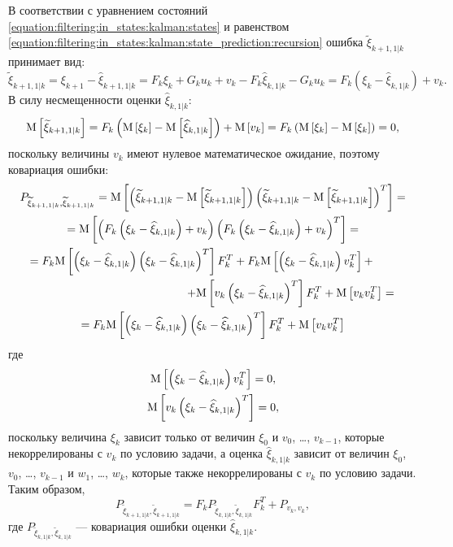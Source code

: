 В соответствии с уравнением состояний \eqref{equation:filtering:in_states:kalman:states} и равенством
\eqref{equation:filtering:in_states:kalman:state_prediction:recursion} ошибка $\widetilde{\xi}_{k+1, 1|k}$ принимает вид:
$$
	\widetilde{\xi}_{k+1,1|k}
		= \xi_{k+1} - \widehat{\xi}_{k+1,1|k}
		= F_k \xi_k + G_k u_k + v_k - F_k \widehat{\xi}_{k,1|k} - G_k u_k
		= F_k \left ( \xi_k - \widehat{\xi}_{k,1|k} \right ) + v_k
	.
$$
В силу несмещенности оценки $\widehat{\xi}_{k,1|k}$:
\begin{equation} \label{equation:filtering:in_states:kalman:state_prediction:unbiasedness}
	\mathrm{M} \left [ \widetilde{\xi}_{k+1,1|k} \right ]
		= F_k \left ( \mathrm{M} \left [ \xi_k \right ] - \mathrm{M} \left [ \widehat{\xi}_{k,1|k} \right ] \right ) + \mathrm{M} \left [ v_k \right ]
		= F_k \left ( \mathrm{M} \left [ \xi_k \right ] - \mathrm{M} \left [ \xi_k \right ] \right )
		= 0
	,
\end{equation}
поскольку величины $v_k$ имеют нулевое математическое ожидание, поэтому ковариация ошибки:
\begin{multline*}
	P_{\widetilde{\xi}_{k+1,1|k}, \widetilde{\xi}_{k+1,1|k}}
		= \outerexpectation{\widetilde{\xi}_{k+1,1|k}}{\widetilde{\xi}_{k+1,1|k}} = \\
	= \expectation{ \left ( F_k \left ( \xi_k - \widehat{\xi}_{k,1|k} \right ) + v_k \right ) \left ( F_k \left ( \xi_k - \widehat{\xi}_{k,1|k} \right ) + v_k \right )^T } = \\
	\shoveleft{
		= F_k \expectation{ \left ( \xi_k - \widehat{\xi}_{k,1|k} \right ) \left ( \xi_k - \widehat{\xi}_{k,1|k} \right )^T } F_k^T
			+ F_k \expectation{ \left ( \xi_k - \widehat{\xi}_{k,1|k} \right ) v_k^T } +
	} \\
	\shoveright{
		+ \expectation{ v_k \left ( \xi_k - \widehat{\xi}_{k,1|k} \right )^T } F_k^T
			+ \expectation{ v_k v_k^T } =
	} \\
	= F_k \expectation{ \left ( \xi_k - \widehat{\xi}_{k,1|k} \right ) \left ( \xi_k - \widehat{\xi}_{k,1|k} \right )^T } F_k^T + \expectation{ v_k v_k^T }
\end{multline*}
где
\begin{gather*}
	\mathrm{M} \left [  \left ( \xi_k - \widehat{\xi}_{k,1|k} \right ) v_k^T  \right ] = 0 , \\
	\mathrm{M} \left [  v_k \left ( \xi_k - \widehat{\xi}_{k,1|k} \right )^T  \right ] = 0 ,
\end{gather*}
поскольку величина $\xi_k$ зависит только от величин $\xi_0$ и $v_0$, \dots, $v_{k-1}$, которые некоррелированы с $v_k$ по условию задачи, а оценка
$\widehat{\xi}_{k,1|k}$ зависит от величин $\xi_0$, $v_0$, \dots, $v_{k-1}$ и $w_1$, \dots, $w_k$, которые также некоррелированы с $v_k$ по условию задачи. Таким образом,
\begin{equation} \label{equation:filtering:in_states:kalman:state_prediction:error_covariance_recursion}
	P_{\widetilde{\xi}_{k+1,1|k}, \widetilde{\xi}_{k+1,1|k}} = F_k P_{\widetilde{\xi}_{k,1|k}, \widetilde{\xi}_{k,1|k}} F_k^T + P_{v_k, v_k} ,
\end{equation}
где $P_{\widetilde{\xi}_{k,1|k}, \widetilde{\xi}_{k,1|k}}$ --- ковариация ошибки оценки $\widehat{\xi}_{k,1|k}$.

